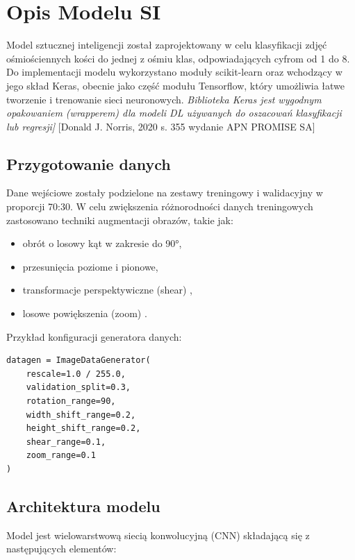 \section{Opis Modelu SI}\label{sec:opis-modelu-si}

Model sztucznej inteligencji został zaprojektowany w celu klasyfikacji zdjęć ośmiościennych kości do jednej z ośmiu klas, odpowiadających cyfrom od 1 do 8.
Do implementacji modelu wykorzystano moduły scikit-learn oraz wchodzący w jego skład Keras, obecnie jako część modułu Tensorflow, który umożliwia łatwe tworzenie i trenowanie sieci neuronowych.
\textit{Biblioteka Keras jest wygodnym opakowaniem (wrapperem) dla modeli DL używanych do oszacowań klasyfikacji lub regresji]} [Donald J. Norris, 2020 s. 355 wydanie APN PROMISE SA]

\subsection{Przygotowanie danych}\label{subsec:przygotowanie-danych}

Dane wejściowe zostały podzielone na zestawy treningowy i walidacyjny w proporcji 70:30.
W celu zwiększenia różnorodności danych treningowych zastosowano techniki augmentacji obrazów, takie jak:

\begin{itemize}
    \item obrót o losowy kąt w zakresie do 90°,
    \item przesunięcia poziome i pionowe,
    \item transformacje perspektywiczne (shear) ,
    \item losowe powiększenia (zoom) .
\end{itemize}

Przykład konfiguracji generatora danych:

\begin{verbatim}
datagen = ImageDataGenerator(
    rescale=1.0 / 255.0,
    validation_split=0.3,
    rotation_range=90,
    width_shift_range=0.2,
    height_shift_range=0.2,
    shear_range=0.1,
    zoom_range=0.1
)
\end{verbatim}

\subsection{Architektura modelu}\label{subsec:architektura-modelu}

Model jest wielowarstwową siecią konwolucyjną (CNN) składającą się z następujących elementów:

